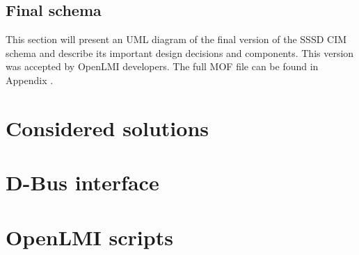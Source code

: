 \subsection{Final schema}

This section will present an UML diagram of the final version of the SSSD CIM
schema and describe its important design decisions and components. This version
was accepted by OpenLMI developers. The full MOF file can be found in Appendix
.

\section{Considered solutions}

\section{D-Bus interface}

\section{OpenLMI scripts}